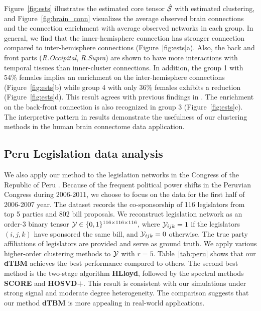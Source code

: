 \documentclass[lettersize,journal]{IEEEtran}
\theoremstyle{definition}
\theoremstyle{definition}
\begin{document}
Figure~\ref{fig:ests} illustrates the estimated core tensor $\hat {\mathcal{S}}$ with estimated clustering, and Figure~\ref{fig:brain_conn} visualizes the average observed brain connections and the connection enrichment with average observed networks in each group. In general, we find that the inner-hemisphere connection has stronger connection compared to inter-hemisphere connections (Figure~\ref{fig:ests}a). Also, the back and front parts (\emph{R.Occipital}, \emph{R.Supra}) are shown to have more interactions with temporal tissues than inner-cluster connections. In addition, the group 1 with 54\% females implies an enrichment on the inter-hemisphere connections (Figure~\ref{fig:ests}b) while group 4 with only 36\% females exhibits a reduction (Figure~\ref{fig:ests}d). This result agrees with previous findings in \cite{hu2021generalized}. The enrichment on the back-front connection is also recognized in group 3 (Figure~\ref{fig:ests}c). The interpretive pattern in results demonstrate the usefulness of our clustering methods in the human brain connectome data application. 


\subsection{Peru Legislation data analysis}

We also apply our method to the legislation networks in the Congress of the Republic of Peru \citep{lee2017time}. Because of the frequent political power shifts in the Peruvian Congress during 2006-2011, we choose to focus on the data for the first half of 2006-2007 year. The dataset records the co-sponsorship of 116 legislators from top 5 parties and 802 bill proposals. We reconstruct legislation network as an order-3 binary tensor $\mathcal{Y} \in \{0,1\}^{116 \times 116 \times 116}$, where $\mathcal{Y}_{ijk} = 1$ if the legislators $(i,j,k)$ have sponsored the same bill, and $\mathcal{Y}_{ijk} = 0$ otherwise. The true party affiliations of legislators are provided and serve as ground truth. We apply various higher-order clustering methods to $\mathcal{Y}$ with $r = 5$. Table~\ref{tab:peru} shows that our \textbf{\small dTBM} achieves the best performance compared to others. The second best method is the two-stage algorithm \textbf{\small HLloyd}, followed by the spectral methods \textbf{\small SCORE} and \textbf{\small HOSVD+}. This result is consistent with our simulations under strong signal and moderate degree heterogeneity. The comparison suggests that our method \textbf{\small dTBM} is more appealing in real-world applications.
\end{document}
